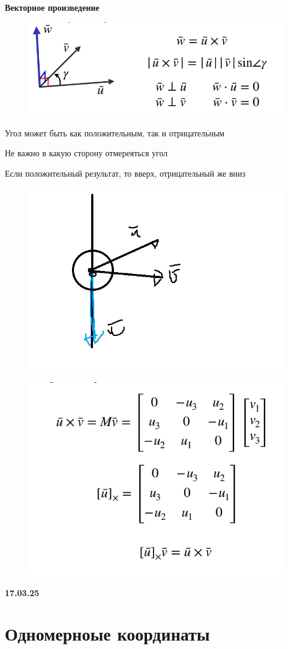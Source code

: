 \documentclass{article}
\begin{document}
\textbf{Векторное произведение}
\begin{figure} [H]
    \includegraphics[width=0.50\linewidth]{Снимок экрана 2025-03-10 131820.png}
\end{figure}


Угол может быть как положительным, так и отрицательным

Не важно в какую сторону отмереяться угол

Если положительный результат, то вверх, 
отрицательный же вниз

\begin{figure} [H]
    \includegraphics[width=0.50\linewidth]{11.png}
\end{figure}




\begin{figure} [H]
    \includegraphics[width=0.50\linewidth]{Снимок экрана 2025-03-10 133749.png}
\end{figure}



\textbf{17.03.25}


\section{Одномерноые координаты}
\end{document}
